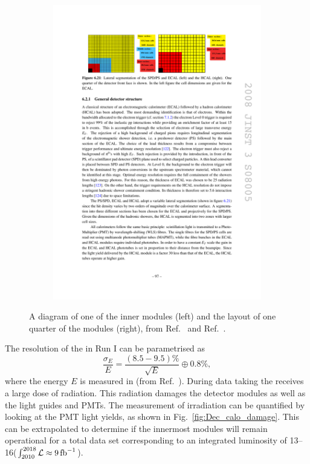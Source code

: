 \begin{figure}[!h]
\begin{subfigure}[m]{0.4\textwidth}
        \includegraphics[width=1.0\textwidth]{figs/Detector/ecal_layout.pdf}
    \end{subfigure}
    \caption{A diagram of one of the inner \ecal modules (left) and the layout of one quarter of the \ecal modules (right), from Ref.~\cite{Alves:2008zz} and Ref.~\cite{doi:1765047}.}
    \label{fig:Dec_ecal_layout}   
\end{figure}

The resolution of the \ecal in Run I can be parametrised as 
\begin{equation}
\frac{\sigma_{E}}{E} = \frac{(8.5-9.5)\%}{\sqrt{E}} \oplus 0.8\%,
\end{equation}
where the energy $E$ is measured in \gev (from Ref.~\cite{1748-0221-12-07-C07024}). During data taking the \ecal receives a large dose of radiation. This radiation damages the detector modules as well as the light guides and PMTs. The measurement of irradiation can be quantified by looking at the PMT light yields, as shown in Fig.~\ref{fig:Dec_calo_damage}. This can be extrapolated to determine if the innermost \ecal modules will remain operational for a total data set corresponding to an integrated luminosity of 13--16\invfb ($\int_{2010}^{2018}\mathcal{L} \approx 9 \mbox{\,fb}^{-1} $).   


